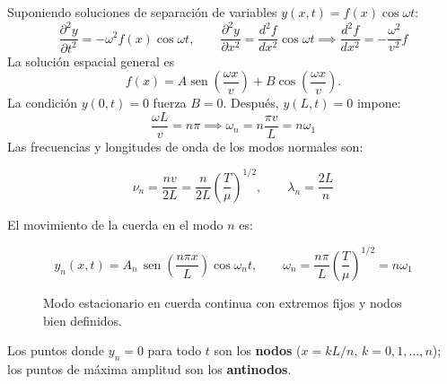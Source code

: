 \documentclass[12pt, a4paper]{article}
\theoremstyle{plain}
\theoremstyle{definition}
\theoremstyle{remark}
\DeclareMathOperator{\sen}{sen}
\begin{document}
Suponiendo soluciones de separación de variables $y(x,t)=f(x)\cos\omega t$:
\begin{equation}
  \frac{\partial^2 y}{\partial t^2} = -\omega^2 f(x)\cos\omega t,\qquad
  \frac{\partial^2 y}{\partial x^2} = \frac{d^2f}{dx^2}\cos\omega t
  \implies \frac{d^2f}{dx^2} = -\frac{\omega^2}{v^2}f
\end{equation}
La solución espacial general es
\[
  f(x)=A\sen\!\left(\frac{\omega x}{v}\right)+B\cos\!\left(\frac{\omega x}{v}\right).
\]
La condición $y(0,t)=0$ fuerza $B=0$. Después, $y(L,t)=0$ impone:
\begin{equation}
  \frac{\omega L}{v} = n\pi \implies \omega_n = n\frac{\pi v}{L} = n\omega_1
\end{equation}
Las frecuencias y longitudes de onda de los modos normales son:
\begin{mdframed}[style=resultado]
\begin{equation}
  \nu_n = \frac{nv}{2L} = \frac{n}{2L}\left(\frac{T}{\mu}\right)^{\!1/2},
  \qquad
  \lambda_n = \frac{2L}{n}
\end{equation}
\end{mdframed}

El movimiento de la cuerda en el modo $n$ es:
\begin{mdframed}[style=resultado]
\begin{equation}
  y_n(x,t) = A_n\,\sen\!\left(\frac{n\pi x}{L}\right)\cos\omega_n t,
  \qquad
  \omega_n = \frac{n\pi}{L}\left(\frac{T}{\mu}\right)^{\!1/2} = n\omega_1
\end{equation}
\end{mdframed}

\begin{figure}[H]
  \centering
  \caption{Modo estacionario en cuerda continua con extremos fijos y nodos bien definidos.}
\end{figure}

Los puntos donde $y_n=0$ para todo $t$ son los \textbf{nodos}
($x = kL/n$, $k=0,1,\ldots,n$); los puntos de máxima amplitud son los
\textbf{antinodos}.
\end{document}
